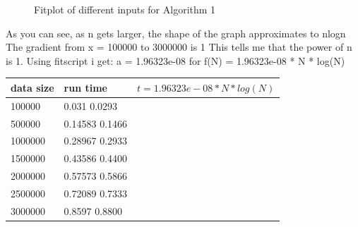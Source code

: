 \documentclass{article}
\begin{document}
\begin{figure}
   \centering
  
   \caption{Fitplot of different inputs for Algorithm 1}
   \label{fig:experiment2}
 \end{figure}

As you can see, as n gets larger, the shape of the graph approximates to nlogn
The gradient from x = 100000 to 3000000 is 1
This  tells me that the power of n is 1.
Using fitscript i get: a = 1.96323e-08 for f(N) = 1.96323e-08 * N * log(N)


 \begin{center}
 \begin{tabular}{l||l|l|}
   data size   & run time    & $t = 1.96323e-08*N*log(N)$       \\  \hline
   100000      &0.031            0.0293                \\
   500000			 &0.14583					 0.1466						     \\
   1000000		 &0.28967					 0.2933						     \\
   1500000		 &0.43586				   0.4400							   \\
   2000000	   &0.57573					 0.5866							   \\
   2500000		 &0.72089					 0.7333						     \\
   3000000     &0.8597           0.8800                \\

\end{tabular}
 \end{center}
\end{document}
